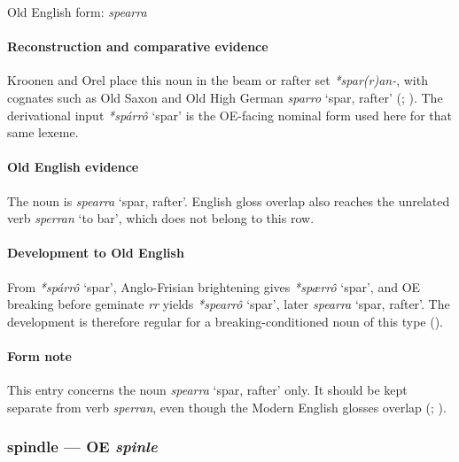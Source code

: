 \documentclass[
  british,
  a4paper,
]{article}
\providecommand{\Recon}[1]{\emph{*#1}}
\begin{document}
Old English form: \emph{spearra}

\paragraph{Reconstruction and comparative
evidence}\label{reconstruction-and-comparative-evidence-57}

Kroonen and Orel place this noun in the beam or rafter set
\emph{*spar(r)an-}, with cognates such as Old Saxon and Old High German
{\emph{sparro}} `spar, rafter' (; ). The derivational input
\Recon{spárrô} `spar' is the OE-facing nominal form used here for that
same lexeme.

\paragraph{Old English evidence}\label{old-english-evidence-59}

The noun is {\emph{spearra}} `spar, rafter'. English gloss overlap also
reaches the unrelated verb \emph{sperran} `to bar', which does not
belong to this row.

\paragraph{Development to Old
English}\label{development-to-old-english-58}

From \Recon{spárrô} `spar', Anglo-Frisian brightening gives
\Recon{spærrô} `spar', and OE breaking before geminate \emph{rr} yields
\Recon{spearrô} `spar', later {\emph{spearra}} `spar, rafter'. The
development is therefore regular for a breaking-conditioned noun of this
type ().

\paragraph{Form note}\label{form-note-18}

This entry concerns the noun {\emph{spearra}} `spar, rafter' only. It
should be kept separate from verb \emph{sperran}, even though the Modern
English glosses overlap (;
).

\subsubsection{\texorpdfstring{spindle --- OE
\emph{spinle}}{spindle --- OE spinle}}\label{spindle-oe-spinle}
\end{document}
